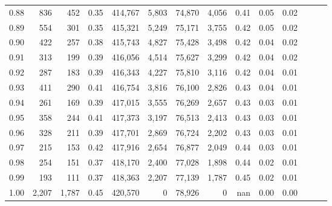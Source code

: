 \begin{tabular}{rrrrrrrrrrrrrr}
0.88 &     836 &    452 &  0.35 &  414,767 &    5,803 &  74,870 &   4,056 &  0.41 &  0.05 &      0.02 \\
0.89 &     554 &    301 &  0.35 &  415,321 &    5,249 &  75,171 &   3,755 &  0.42 &  0.05 &      0.02 \\
0.90 &     422 &    257 &  0.38 &  415,743 &    4,827 &  75,428 &   3,498 &  0.42 &  0.04 &      0.02 \\
0.91 &     313 &    199 &  0.39 &  416,056 &    4,514 &  75,627 &   3,299 &  0.42 &  0.04 &      0.02 \\
0.92 &     287 &    183 &  0.39 &  416,343 &    4,227 &  75,810 &   3,116 &  0.42 &  0.04 &      0.01 \\
0.93 &     411 &    290 &  0.41 &  416,754 &    3,816 &  76,100 &   2,826 &  0.43 &  0.04 &      0.01 \\
0.94 &     261 &    169 &  0.39 &  417,015 &    3,555 &  76,269 &   2,657 &  0.43 &  0.03 &      0.01 \\
0.95 &     358 &    244 &  0.41 &  417,373 &    3,197 &  76,513 &   2,413 &  0.43 &  0.03 &      0.01 \\
0.96 &     328 &    211 &  0.39 &  417,701 &    2,869 &  76,724 &   2,202 &  0.43 &  0.03 &      0.01 \\
0.97 &     215 &    153 &  0.42 &  417,916 &    2,654 &  76,877 &   2,049 &  0.44 &  0.03 &      0.01 \\
0.98 &     254 &    151 &  0.37 &  418,170 &    2,400 &  77,028 &   1,898 &  0.44 &  0.02 &      0.01 \\
0.99 &     193 &    111 &  0.37 &  418,363 &    2,207 &  77,139 &   1,787 &  0.45 &  0.02 &      0.01 \\
1.00 &   2,207 &  1,787 &  0.45 &  420,570 &        0 &  78,926 &       0 &   nan &  0.00 &      0.00 \\
\bottomrule
\end{tabular}
